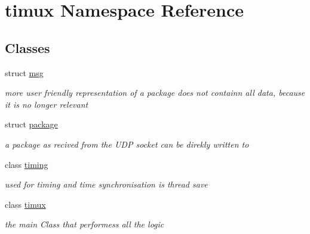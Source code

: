 \hypertarget{namespacetimux}{\section{timux Namespace Reference}
\label{namespacetimux}
}
\subsection*{Classes}
\begin{DoxyCompactItemize}
\item 
struct \hyperlink{structtimux_1_1msg}{msg}
\begin{DoxyCompactList}\small\item\em more user friendly representation of a package does not containn all data, because it is no longer relevant \end{DoxyCompactList}\item 
struct \hyperlink{structtimux_1_1package}{package}
\begin{DoxyCompactList}\small\item\em a package as recived from the U\+D\+P socket can be direkly written to \end{DoxyCompactList}\item 
class \hyperlink{classtimux_1_1timing}{timing}
\begin{DoxyCompactList}\small\item\em used for timing and time synchronisation is thread save \end{DoxyCompactList}\item 
class \hyperlink{classtimux_1_1timux}{timux}
\begin{DoxyCompactList}\small\item\em the main Class that performess all the logic \end{DoxyCompactList}\end{DoxyCompactItemize}
